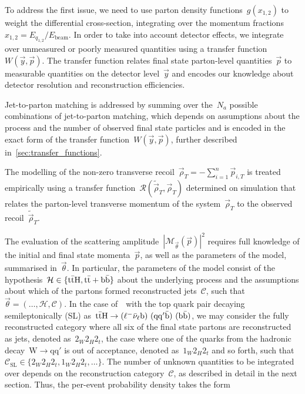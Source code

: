 To address the first issue, we need to use parton density functions~$g(x_{1,2})$ to weight the differential cross-section, integrating over the momentum fractions~$x_{1,2} = E_{q_{1,2}}/E_{\mathrm{beam}}$.
In order to take into account detector effects, we integrate over unmeasured or poorly measured quantities using a transfer function~$W(\vec{y}, \vec{p})$.
The transfer function relates final state parton-level quantities~$\vec{p}$ to measurable quantities on the detector level~$\vec{y}$ and encodes our knowledge about detector resolution and reconstruction efficiencies.

Jet-to-parton matching is addressed by summing over the~$N_a$ possible combinations of jet-to-parton matching, which depends on assumptions about the process and the number of observed final state particles and is encoded in the exact form of the transfer function~$W(\vec{y}, \vec{p})$, further described in~\cref{sec:transfer_functions}.

The modelling of the non-zero transverse recoil~$\vec{\rho}_T = -\sum_{i=1}^n \vec{p}_{i,T}$ is treated empirically using a transfer function~$\mathcal{R}(\tilde{\vec{\rho}}_T, \vec{\rho}_T)$ determined on simulation that relates the parton-level transverse momentum of the system~$\vec{\rho}_T$ to the observed recoil~$\tilde{\vec{\rho}}_T$. 

The evaluation of the scattering amplitude~$|\mathcal{M}_{\vec{\theta}}(\vec{p})|^2$ requires full knowledge of the initial and final state momenta~$\vec{p}$, as well as the parameters of the model, summarised in~$\vec{\theta}$. In particular, the parameters of the model consist of the hypothesis~$\mathcal{H} \in \{\mathrm{t} \bar{\mathrm{t}} \mathrm{H}, \mathrm{t} \bar{\mathrm{t}} + \mathrm{b}\bar{\mathrm{b}}\}$ about the underlying process and the assumptions about which of the partons formed reconstructed jets~$\mathcal{C}$, such that~$\vec{\theta} = (\dots, \mathcal{H}, \mathcal{C})$. In the case of~\ttH~with the top quark pair decaying semileptonically (SL) as~$\mathrm{t} \bar{\mathrm{t}} \mathrm{H} \rightarrow (\ell^- \bar{\mathrm{\nu}}_\ell \mathrm{b})\ (\mathrm{q} \mathrm{q}' \bar{\mathrm{b}})\ (\mathrm{b} \bar{\mathrm{b}})$, we may consider the fully reconstructed category where all six of the final state partons are reconstructed as jets, denoted as~$2_W 2_H 2_t$, the case where one of the quarks from the hadronic decay~$\mathrm{W} \rightarrow \mathrm{q} \mathrm{q}'$ is out of acceptance, denoted as~$1_W 2_H 2_t$ and so forth, such that~$\mathcal{C}_{\mathrm{SL}} \in \{ 2_W 2_H 2_t, 1_W 2_H 2_t, \dots \}$. The number of unknown quantities to be integrated over depends on the reconstruction category~$\mathcal{C}$, as described in detail in the next section. 
Thus, the per-event probability density takes the form

